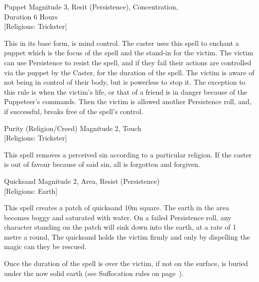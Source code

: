 \begin{rpg-spell}
{Puppet}
{Magnitude 3, Resit (Persistence), Concentration,\\Duration 6 Hours\\{[Religions: Trickster]}}

This in its base form, is mind control. The caster uses this spell to enchant a puppet which is the focus of the spell and the stand-in for the victim. The victim can use Persistence to resist the spell, and if they fail their actions are controlled via the puppet by the Caster, for the duration of the spell. The victim is aware of not being in control of their body, but is powerless to stop it. The exception to this rule is when the victim’s life, or that of a friend is in danger because of the Puppeteer’s commands. Then the victim is allowed another Persistence roll, and, if successful, breaks free of the spell’s control.
\end{rpg-spell}

\begin{rpg-spell}
{Purity (Religion/Creed)}
{Magnitude 2, Touch\\{[Religions: Trickster]}}

This spell removes a perceived sin according to a particular religion. If the caster is out of favour because of said sin, all is forgotten and forgiven.
\end{rpg-spell}

\begin{rpg-spell}
{Quicksand}
{Magnitude 2, Area, Resist (Persistence)\\{[Religions: Earth]}}

This spell creates a patch of quicksand 10m square. The earth in the area becomes boggy and saturated with water. On a failed Persistence roll, any character standing on the patch will sink down into the earth, at a rate of 1 metre a round, The quicksand holds the victim firmly and only by dispelling the magic can they be rescued.

Once the duration of the spell is over the victim, if not on the surface, is buried under the now solid earth (see Suffocation rules on page~\pageref{ssec:suffocation}).
\end{rpg-spell}

